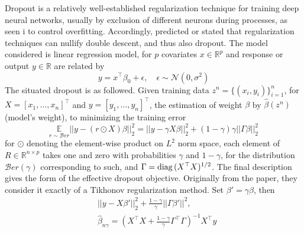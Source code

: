 Dropout is a relatively well-established regularization technique for training deep neural networks, usually by exclusion of different neurons during processes, as seen i \cite{srivastava2014dropout} to control overfitting. Accordingly, \cite{Yang_2024} predicted or stated that regularization techniques can nullify double descent, and thus also dropout. The model considered is linear regression model, for $p$ covariates $x\in\mathbb{R}^{p}$ and response or output $y\in\mathbb{R}$ are related by \begin{equation}
    y = x^{\top}\beta_{0}+\epsilon , \quad \epsilon \sim \mathcal{N}(0,\sigma^{2})
\end{equation}
The situated dropout is as followed. Given training data $z^{n}=\{(x_{i},y_{i})\}^{n}_{i=1}$, for $X=[x_1,\dots,x_n]^{\top}$ and $y=[y_{1},\dots,y_{n}]^{\top}$, the estimation of weight $\beta$ by $\hat{\beta}(z^n)$ (model's weight), to minimizing the training error 
\begin{equation}
    \underset{r\sim\mathcal{B}er}{\mathbb{E}} || y - (r\odot X)\beta ||^{2}_{2} = ||y-\gamma X\beta||^{2}_{2} + (1-\gamma)\gamma ||\Gamma \beta ||_{2}^{2}
\end{equation}
for $\odot$ denoting the element-wise product on $L^{2}$ norm space, each element of $R\in\mathbb{R}^{n\times p}$ takes one and zero with probabilities $\gamma$ and $1-\gamma$, for the distribution $\mathcal{B}er(\gamma)$ corresponding to such, and $\Gamma = \operatorname{diag}{(X^{\top}X)^{1/2}}$. The final description gives the form of the effective dropout objective. Originally from the paper, they consider it exactly of a Tikhonov regularization method. Set $\beta'=\gamma \beta$, then \begin{equation}
    \begin{split}
        &||y-X\beta'||_{2}^{2} + \frac{1-\gamma}{\gamma} ||\Gamma \beta'||^2, \\
        &\hat{\beta}_{n\gamma} = \left(X^{\top}X+\frac{1-\gamma}{\gamma}\Gamma^{\top}\Gamma\right)^{-1}X^{\top}y
    \end{split}
\end{equation}
